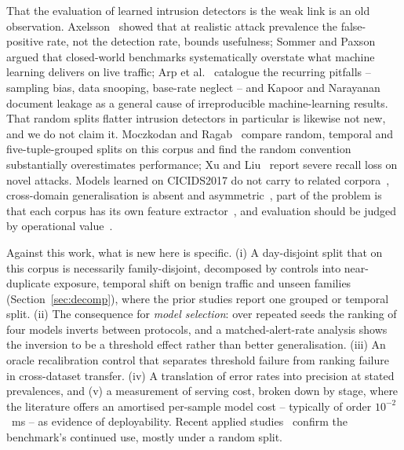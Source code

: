 \documentclass{llncs}
\begin{document}
That the evaluation of learned intrusion detectors is the weak link is an
old observation. Axelsson~\cite{axelsson1999baserate} showed that at
realistic attack prevalence the false-positive rate, not the detection rate,
bounds usefulness; Sommer and Paxson~\cite{sommer2010closedworld} argued
that closed-world benchmarks systematically overstate what machine learning
delivers on live traffic; Arp et al.~\cite{arp2023lessons} catalogue the
recurring pitfalls -- sampling bias, data snooping, base-rate neglect -- and
Kapoor and Narayanan~\cite{kapoor2023leakage} document leakage as a general
cause of irreproducible machine-learning results. That random splits flatter
intrusion detectors in particular is likewise not new, and we do not claim
it. Moczkodan and Ragab~\cite{moczkodan2026transformers} compare random,
temporal and five-tuple-grouped splits on this corpus and find the random
convention substantially overestimates performance; Xu and
Liu~\cite{xu2025robust} report severe recall loss on novel attacks. Models
learned on CICIDS2017 do not carry to related
corpora~\cite{dhooge2020interdataset,catillo2022transferability}, cross-domain
generalisation is absent and asymmetric~\cite{layeghy2023crossdomain}, part of
the problem is that each corpus has its own feature
extractor~\cite{sarhan2022standard}, and evaluation should be judged by
operational value~\cite{apruzzese2023sok}.

Against this work, what is new here is specific. (i) A day-disjoint split
that on this corpus is necessarily family-disjoint, decomposed by controls
into near-duplicate exposure, temporal shift on benign traffic and unseen
families (Section~\ref{sec:decomp}), where the prior studies report one
grouped or temporal split. (ii) The consequence for \emph{model selection}:
over repeated seeds the ranking of four models inverts between protocols, and
a matched-alert-rate analysis shows the inversion to be a threshold effect
rather than better generalisation. (iii) An oracle recalibration control
that separates threshold failure from ranking failure in cross-dataset
transfer. (iv) A translation of error rates into precision at
stated prevalences, and (v) a measurement of serving cost, broken down by
stage, where the literature offers an amortised per-sample model cost --
typically of order $10^{-2}$~ms -- as evidence of deployability.
Recent applied studies~\cite{talukder2024ml,almuhanna2025dl} confirm the
benchmark's continued use, mostly under a random split.

\end{document}

